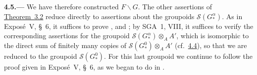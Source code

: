 
\medskip
{}\label{par:sga3-VIA-4.5}%
\noindent\textbf{4.5.---}
We have therefore constructed \(F\backslash G\). The other
assertions of \hyperref[thm:sga3-VIA-3.2]{Theorem~3.2} reduce directly to assertions about the
groupoids \(\mathscr S(G^\alpha_*)\). As in Expos\'e~V, \S~6, it suffices
to prove ,  and ; by SGA~1, VIII, it suffices to verify the
corresponding assertions for the groupoid
\(\mathscr S(G^\alpha_*)\otimes_AA'\), which is isomorphic to the direct sum of finitely many copies of
\(\mathscr S(G^0_*)\otimes_AA'\) (cf.\ \hyperref[par:sga3-VIA-4.4]{4.4}), so that we are reduced to the
groupoid \(\mathscr S(G^0_*)\). For this last groupoid we continue to
follow the proof given in Expos\'e~V, \S~6, as we began to do in .

